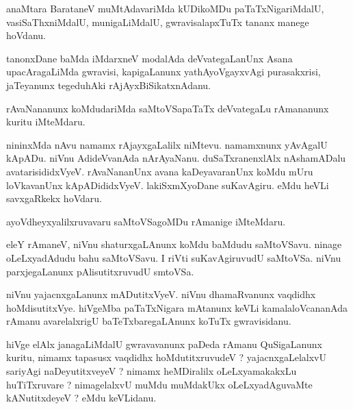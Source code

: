 \documentclass{article}
\begin{document}
\begin{mn}
anaMtara  BarataneV  muMtAdavariMda  kUDikoMDu  paTaTxNigariMdalU,  vasiSaThxniMdalU,  munigaLiMdalU,  gwravisalapxTuTx  tananx  manege  hoVdanu.
\end{mn}

\begin{mn}
tanonxDane  baMda  iMdarxneV  modalAda  deVvategaLanUnx  Asana  upacAragaLiMda  gwravisi,  kapigaLanunx  yathAyoVgayxvAgi  purasakxrisi,  
jaTeyanunx  tegeduhAki  rAjAyxBiSikatxnAdanu.
\end{mn}

\begin{mn}
rAvaNananunx  koMdudariMda  saMtoVSapaTaTx  deVvategaLu  rAmananunx  kuritu  iMteMdaru.
\end{mn}

\begin{mn}
nininxMda  nAvu  namamx  rAjayxgaLalilx  niMtevu.  namamxnunx  yAvAgalU  kApADu.  niVnu  AdideVvanAda  nArAyaNanu.  duSaTxranenxlAlx  
nAshamADalu  avatarisididxVyeV.  rAvaNananUnx  avana  kaDeyavaranUnx  koMdu  mUru  loVkavanUnx  kApADididxVyeV.  lakiSxmXyoDane  
suKavAgiru.  eMdu  heVLi  savxgaRkekx  hoVdaru.
\end{mn}

\begin{mn}
ayoVdheyxyalilxruvavaru  saMtoVSagoMDu  rAmanige  iMteMdaru.
\end{mn}

\begin{mn}
eleY  rAmaneV,  niVnu  shaturxgaLAnunx  koMdu  baMdudu  saMtoVSavu.  ninage  oLeLxyadAdudu  bahu saMtoVSavu.  I  riVti  suKavAgiruvudU  
saMtoVSa.  niVnu  parxjegaLanunx  pAlisutitxruvudU  smtoVSa.
\end{mn}

\begin{mn}
niVnu  yajacnxgaLanunx  mADutitxVyeV.  niVnu  dhamaRvanunx  vaqdidhx  hoMdisutitxVye.  hiVgeMba  paTaTxNigara  mAtanunx  keVLi  
kamalaloVcananAda  rAmanu  avarelalxrigU  baTeTxbaregaLAnunx  koTuTx  gwravisidanu.
\end{mn}

\begin{mn}
hiVge  elAlx  janagaLiMdalU  gwravavanunx  paDeda  rAmanu  QuSigaLanunx  kuritu,  nimamx  tapasusx  vaqdidhx hoMdutitxruvudeV ?  
yajacnxgaLelalxvU  sariyAgi  naDeyutitxveyeV ?  nimamx  heMDiralilx  oLeLxyamakakxLu  huTiTxruvare ?  nimagelalxvU  muMdu  muMdakUkx  
oLeLxyadAguvaMte  kANutitxdeyeV ?  eMdu  keVLidanu.
\end{mn}
\end{document}
